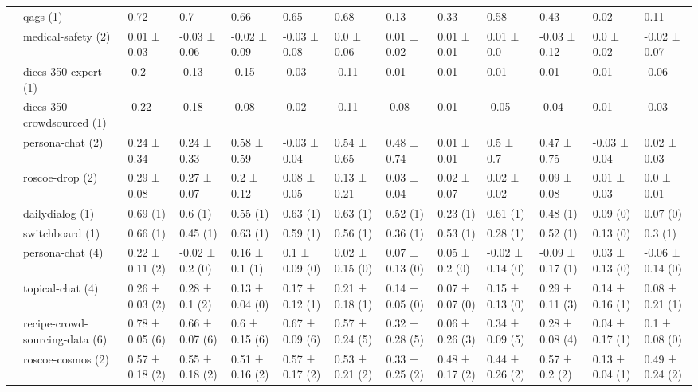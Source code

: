\begin{tabular}{lllllllllllll}
 & \cellcolor{red!25}qags (1) & 0.72   & 0.7   & 0.66   & 0.65   & 0.68   & 0.13   & 0.33   & 0.58   & 0.43   & 0.02   & 0.11   \\
 & \cellcolor{red!25}medical-safety (2) & 0.01 ± 0.03 & -0.03 ± 0.06 & -0.02 ± 0.09 & -0.03 ± 0.08 & 0.0 ± 0.06 & 0.01 ± 0.02 & 0.01 ± 0.01 & 0.01 ± 0.0 & -0.03 ± 0.12 & 0.0 ± 0.02 & -0.02 ± 0.07 \\
 & \cellcolor{red!25}dices-350-expert (1) & -0.2   & -0.13   & -0.15   & -0.03   & -0.11   & 0.01   & 0.01   & 0.01   & 0.01   & 0.01   & -0.06   \\
 & \cellcolor{red!25}dices-350-crowdsourced (1) & -0.22   & -0.18   & -0.08   & -0.02   & -0.11   & -0.08   & 0.01   & -0.05   & -0.04   & 0.01   & -0.03   \\
 & \cellcolor{red!25}persona-chat (2) & 0.24 ± 0.34 & 0.24 ± 0.33 & 0.58 ± 0.59 & -0.03 ± 0.04 & 0.54 ± 0.65 & 0.48 ± 0.74 & 0.01 ± 0.01 & 0.5 ± 0.7 & 0.47 ± 0.75 & -0.03 ± 0.04 & 0.02 ± 0.03 \\
 & \cellcolor{red!25}roscoe-drop (2) & 0.29 ± 0.08 & 0.27 ± 0.07 & 0.2 ± 0.12 & 0.08 ± 0.05 & 0.13 ± 0.21 & 0.03 ± 0.04 & 0.02 ± 0.07 & 0.02 ± 0.02 & 0.09 ± 0.08 & 0.01 ± 0.03 & 0.0 ± 0.01 \\
 & \cellcolor{blue!25}dailydialog (1) & 0.69   (1) & 0.6   (1) & 0.55   (1) & 0.63   (1) & 0.63   (1) & 0.52   (1) & 0.23   (1) & 0.61   (1) & 0.48   (1) & 0.09   (0) & 0.07   (0) \\
 & \cellcolor{blue!25}switchboard (1) & 0.66   (1) & 0.45   (1) & 0.63   (1) & 0.59   (1) & 0.56   (1) & 0.36   (1) & 0.53   (1) & 0.28   (1) & 0.52   (1) & 0.13   (0) & 0.3   (1) \\
 & \cellcolor{red!25}persona-chat (4) & 0.22 ± 0.11 (2) & -0.02 ± 0.2 (0) & 0.16 ± 0.1 (1) & 0.1 ± 0.09 (0) & 0.02 ± 0.15 (0) & 0.07 ± 0.13 (0) & 0.05 ± 0.2 (0) & -0.02 ± 0.14 (0) & -0.09 ± 0.17 (1) & 0.03 ± 0.13 (0) & -0.06 ± 0.14 (0) \\
 & \cellcolor{red!25}topical-chat (4) & 0.26 ± 0.03 (2) & 0.28 ± 0.1 (2) & 0.13 ± 0.04 (0) & 0.17 ± 0.12 (1) & 0.21 ± 0.18 (1) & 0.14 ± 0.05 (0) & 0.07 ± 0.07 (0) & 0.15 ± 0.13 (0) & 0.29 ± 0.11 (3) & 0.14 ± 0.16 (1) & 0.08 ± 0.21 (1) \\
 & \cellcolor{red!25}recipe-crowd-sourcing-data (6) & 0.78 ± 0.05 (6) & 0.66 ± 0.07 (6) & 0.6 ± 0.15 (6) & 0.67 ± 0.09 (6) & 0.57 ± 0.24 (5) & 0.32 ± 0.28 (5) & 0.06 ± 0.26 (3) & 0.34 ± 0.09 (5) & 0.28 ± 0.08 (4) & 0.04 ± 0.17 (1) & 0.1 ± 0.08 (0) \\
 & \cellcolor{red!25}roscoe-cosmos (2) & 0.57 ± 0.18 (2) & 0.55 ± 0.18 (2) & 0.51 ± 0.16 (2) & 0.57 ± 0.17 (2) & 0.53 ± 0.21 (2) & 0.33 ± 0.25 (2) & 0.48 ± 0.17 (2) & 0.44 ± 0.26 (2) & 0.57 ± 0.2 (2) & 0.13 ± 0.04 (1) & 0.49 ± 0.24 (2) \\

\end{tabular}
